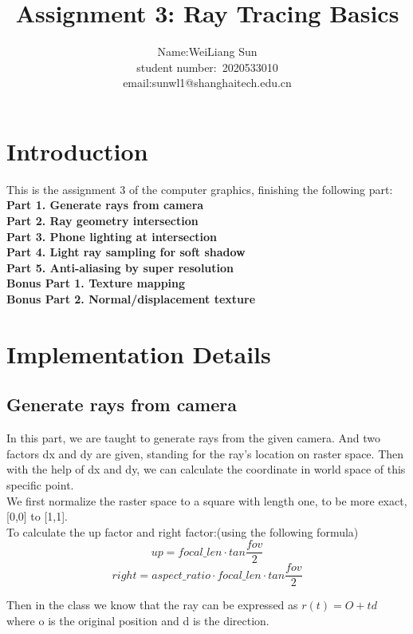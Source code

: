 \documentclass[acmtog]{acmart}
\title{Assignment 3: {Ray Tracing Basics}}
\author{Name:\quad WeiLiang Sun  \\ student number:\ 2020533010
\\email:\quad sunwl1@shanghaitech.edu.cn}
\begin{document}
\maketitle

\vspace*{2 ex}

\section{Introduction}

This is the assignment 3 of the computer graphics, finishing the following part:\\
\textbf{Part 1. Generate rays from camera} \\
\textbf{Part 2. Ray geometry intersection} \\
\textbf{Part 3. Phone lighting at intersection} \\
\textbf{Part 4. Light ray sampling for soft shadow} \\
\textbf{Part 5. Anti-aliasing by super resolution} \\
\textbf{Bonus Part 1. Texture mapping} \\
\textbf{Bonus Part 2. Normal/displacement texture} \\

\section{Implementation Details}

\subsection{Generate rays from camera}

In this part, we are taught to generate rays from the given camera. And two factors dx and dy are given, standing for the ray's location on raster space. Then with the help of dx and dy, we can calculate the coordinate in world space of this specific point. \\
We first normalize the raster space to a square with length one, to be more exact, [0,0] to [1,1]. \\
To calculate the up factor and right factor:(using the following formula)
$$up=focal\_len \cdot tan \frac{fov}{2}$$
$$right=aspect\_ratio \cdot focal\_len \cdot tan \frac{fov}{2}$$

Then in the class we know that the ray can be expressed as $r(t) = O+td$ where o is the original position and d is the direction. \\
\end{document}
